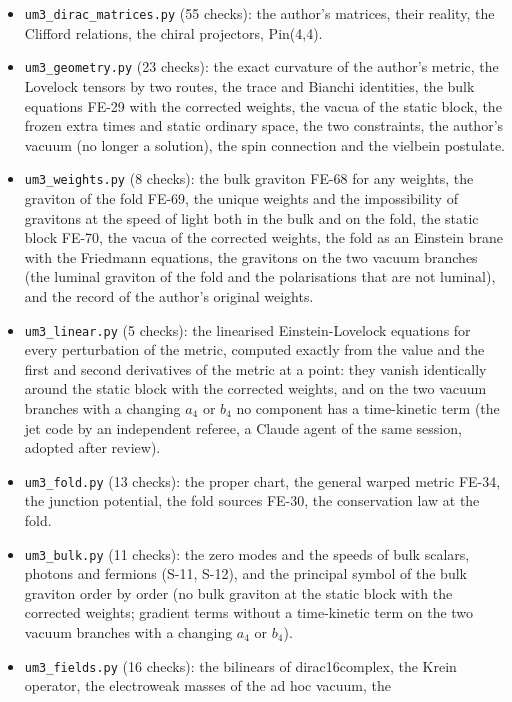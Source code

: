 \documentclass[
  10pt,
]{article}
\providecommand{\tightlist}{%
  \setlength{\itemsep}{0pt}\setlength{\parskip}{0pt}}
\begin{document}
\begin{itemize}
\tightlist
\item
  \texttt{um3\_dirac\_matrices.py} (55 checks): the author's matrices,
  their reality, the Clifford relations, the chiral projectors,
  Pin(4,4).
\item
  \texttt{um3\_geometry.py} (23 checks): the exact curvature of the
  author's metric, the Lovelock tensors by two routes, the trace and
  Bianchi identities, the bulk equations FE-29 with the corrected
  weights, the vacua of the static block, the frozen extra times and
  static ordinary space, the two constraints, the author's vacuum (no
  longer a solution), the spin connection and the vielbein postulate.
\item
  \texttt{um3\_weights.py} (8 checks): the bulk graviton FE-68 for any
  weights, the graviton of the fold FE-69, the unique weights and the
  impossibility of gravitons at the speed of light both in the bulk and
  on the fold, the static block FE-70, the vacua of the corrected
  weights, the fold as an Einstein brane with the Friedmann equations,
  the gravitons on the two vacuum branches (the luminal graviton of the
  fold and the polarisations that are not luminal), and the record of
  the author's original weights.
\item
  \texttt{um3\_linear.py} (5 checks): the linearised Einstein-Lovelock
  equations for every perturbation of the metric, computed exactly from
  the value and the first and second derivatives of the metric at a
  point: they vanish identically around the static block with the
  corrected weights, and on the two vacuum branches with a changing
  \(a_4\) or \(b_4\) no component has a time-kinetic term (the jet code
  by an independent referee, a Claude agent of the same session, adopted
  after review).
\item
  \texttt{um3\_fold.py} (13 checks): the proper chart, the general
  warped metric FE-34, the junction potential, the fold sources FE-30,
  the conservation law at the fold.
\item
  \texttt{um3\_bulk.py} (11 checks): the zero modes and the speeds of
  bulk scalars, photons and fermions (S-11, S-12), and the principal
  symbol of the bulk graviton order by order (no bulk graviton at the
  static block with the corrected weights; gradient terms without a
  time-kinetic term on the two vacuum branches with a changing \(a_4\)
  or \(b_4\)).
\item
  \texttt{um3\_fields.py} (16 checks): the bilinears of dirac16complex,
  the Krein operator, the electroweak masses of the ad hoc vacuum, the

\end{itemize}
\end{document}
